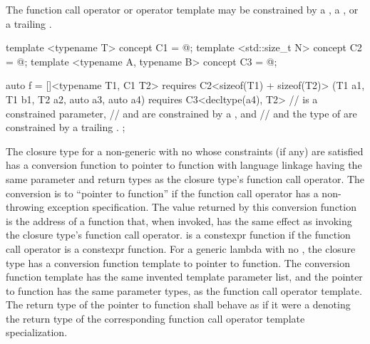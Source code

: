 \pnum
The function call operator or operator template may be constrained
by a , a ,
or a trailing .
\begin{example}
\begin{codeblock}
template <typename T> concept C1 = @\commentellip@;
template <std::size_t N> concept C2 = @\commentellip@;
template <typename A, typename B> concept C3 = @\commentellip@;

auto f = []<typename T1, C1 T2> requires C2<sizeof(T1) + sizeof(T2)>
         (T1 a1, T1 b1, T2 a2, auto a3, auto a4) requires C3<decltype(a4), T2> {
  //  is a constrained parameter,
  //  and  are constrained by a , and
  //  and the type of  are constrained by a trailing .
};
\end{codeblock}
\end{example}

\pnum
The closure type for a non-generic  with no
whose constraints (if any) are satisfied
has a conversion function to pointer to
function with \Cpp{} language linkage having
the same parameter and return types as the closure type's function call operator.
The conversion is to ``pointer to  function''
if the function call operator
has a non-throwing exception specification.
The value returned by this conversion function
is the address of a function  that, when invoked,
has the same effect as invoking the closure type's function call operator.
 is a constexpr function
if the function call operator is a constexpr function.
For a generic lambda with no , the closure type has a
conversion function template to
pointer to function. The conversion function template has the same invented
template parameter list, and the pointer to function has the same
parameter types, as the function call operator template.  The return type of
the pointer to function shall behave as if it were a
 denoting the return type of the corresponding
function call operator template specialization.

